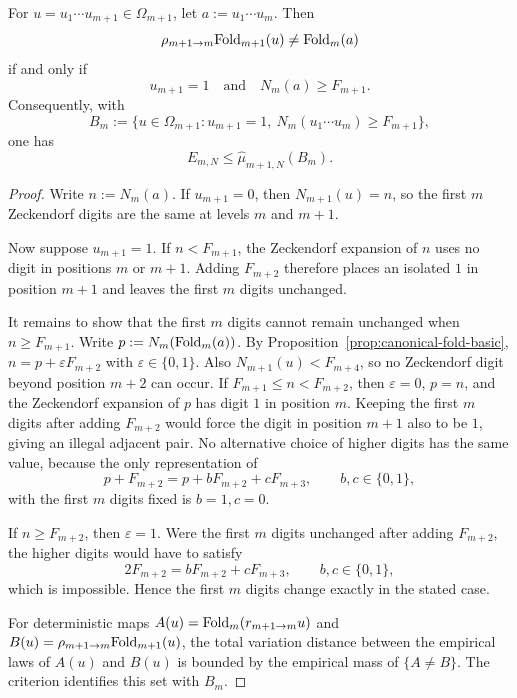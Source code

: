 \begin{theorem}\label{thm:multiscale-residual-by-boundary}
For \(u=u_1\cdots u_{m+1}\in\Omega_{m+1}\), let
\(a:=u_1\cdots u_m\). Then
\[
\rho_{m+1\to m}\mathrm{Fold}_{m+1}(u)\ne \mathrm{Fold}_m(a)
\]
if and only if
\[
u_{m+1}=1
\quad\text{and}\quad
N_m(a)\ge F_{m+1}.
\]
Consequently, with
\[
B_m:=\{u\in\Omega_{m+1}:u_{m+1}=1,\ N_m(u_1\cdots u_m)\ge F_{m+1}\},
\]
one has
\[
E_{m,N}\le \hat\mu_{m+1,N}(B_m).
\]
\end{theorem}

\begin{proof}
Write \(n:=N_m(a)\). If \(u_{m+1}=0\), then
\(N_{m+1}(u)=n\), so the first \(m\) Zeckendorf digits are the same at levels
\(m\) and \(m+1\).

Now suppose \(u_{m+1}=1\). If \(n<F_{m+1}\), the Zeckendorf expansion of \(n\)
uses no digit in positions \(m\) or \(m+1\). Adding \(F_{m+2}\) therefore
places an isolated \(1\) in position \(m+1\) and leaves the first \(m\) digits
unchanged.

It remains to show that the first \(m\) digits cannot remain unchanged when
\(n\ge F_{m+1}\). Write \(p:=N_m(\mathrm{Fold}_m(a))\). By
Proposition~\ref{prop:canonical-fold-basic}, \(n=p+\varepsilon F_{m+2}\) with
\(\varepsilon\in\{0,1\}\). Also \(N_{m+1}(u)<F_{m+4}\), so no Zeckendorf digit
beyond position \(m+2\) can occur. If \(F_{m+1}\le n<F_{m+2}\), then
\(\varepsilon=0\), \(p=n\), and the Zeckendorf expansion of \(p\) has digit
\(1\) in position \(m\). Keeping the first \(m\) digits after adding
\(F_{m+2}\) would force the digit in position \(m+1\) also to be \(1\), giving
an illegal adjacent pair. No alternative choice of higher digits has the same
value, because the only representation of
\[
p+F_{m+2}=p+bF_{m+2}+cF_{m+3},
\qquad b,c\in\{0,1\},
\]
with the first \(m\) digits fixed is \(b=1,c=0\).

If \(n\ge F_{m+2}\), then \(\varepsilon=1\). Were the first \(m\) digits
unchanged after adding \(F_{m+2}\), the higher digits would have to satisfy
\[
2F_{m+2}=bF_{m+2}+cF_{m+3},
\qquad b,c\in\{0,1\},
\]
which is impossible. Hence the first \(m\) digits change exactly in the stated
case.

For deterministic maps \(A(u)=\mathrm{Fold}_m(r_{m+1\to m}u)\) and
\(B(u)=\rho_{m+1\to m}\mathrm{Fold}_{m+1}(u)\), the total variation distance between
the empirical laws of \(A(u)\) and \(B(u)\) is bounded by the empirical mass of
\(\{A\ne B\}\). The criterion identifies this set with \(B_m\).
\end{proof}


